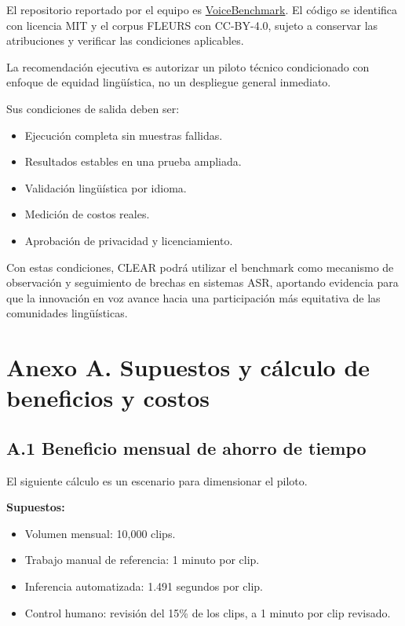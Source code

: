 \documentclass[letterpaper,11pt]{article}
\begin{document}
El repositorio reportado por el equipo es
\href{https://github.com/Luz026/VoiceBenchmark}{VoiceBenchmark}.
El código se identifica con licencia MIT y el corpus
FLEURS con CC-BY-4.0, sujeto a conservar las atribuciones
y verificar las condiciones aplicables.

La recomendación ejecutiva es autorizar un piloto técnico condicionado con enfoque de
equidad lingüística, no un despliegue general inmediato.

Sus condiciones de salida deben ser:

\begin{itemize}[leftmargin=*]
    \item Ejecución completa sin muestras fallidas.
    \item Resultados estables en una prueba ampliada.
    \item Validación lingüística por idioma.
    \item Medición de costos reales.
    \item Aprobación de privacidad y licenciamiento.
\end{itemize}

Con estas condiciones, CLEAR podrá utilizar el benchmark
como mecanismo de observación y seguimiento de brechas
en sistemas ASR, aportando evidencia para que la innovación
en voz avance hacia una participación más equitativa de
las comunidades lingüísticas.


\clearpage
\section*{\color{azul}Anexo A. Supuestos y cálculo de
beneficios y costos}

\subsection*{A.1 Beneficio mensual de ahorro de tiempo}

El siguiente cálculo es un escenario para
dimensionar el piloto.

\textbf{Supuestos:}

\begin{itemize}[leftmargin=*]
    \item Volumen mensual: 10,000 clips.
    \item Trabajo manual de referencia: 1 minuto por clip.
    \item Inferencia automatizada: 1.491 segundos por clip.
    \item Control humano: revisión del 15\% de los clips,
    a 1 minuto por clip revisado.
\end{itemize}
\end{document}
